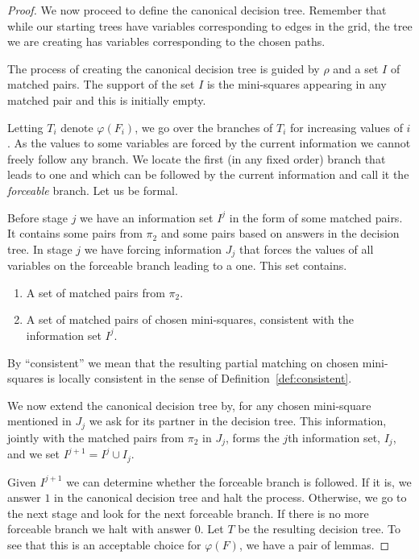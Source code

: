 \documentclass{article}\usepackage[a4paper,margin=20mm]{geometry}
\begin{document}
\begin{proof}
We now proceed to define the
canonical decision tree.  Remember that while our starting trees
have variables corresponding to edges in the grid, the tree we 
are creating has variables corresponding to the chosen paths.

The process of creating the canonical decision tree
is guided by $\rho$
and a set $I$ of matched pairs.  The support of the set
$I$ is the mini-squares appearing in any matched
pair and this is initially empty.

Letting $T_i$ denote $\varphi(F_i)$,
we go over the branches of $T_i$ for increasing
values of $i$.  As the values to some variables
are forced by the current information we cannot freely
follow any branch.  We locate the first (in any fixed order)
branch that leads to one and which can be followed
by the current information and call it the {\em forceable} branch.
Let us be formal.

Before stage $j$ we have an information set $I^{j}$ in the form of
some matched pairs.  It contains
some pairs from $\pi_2$ and some pairs based on answers in the decision
tree.  In stage $j$ we have forcing information $J_j$ that forces
the values of all variables on the forceable branch leading
to a one.  This set contains.

\begin{enumerate}

\item A set of matched pairs from $\pi_2$.

\item A set of matched pairs of chosen mini-squares, consistent
with the information set $I^j$.

\end{enumerate}
By ``consistent'' we mean that the resulting partial
matching on chosen mini-squares is locally consistent in the 
sense of Definition~\ref{def:consistent}.

We now extend the canonical decision tree
by, for any chosen mini-square mentioned in $J_j$ we ask
for its partner in the decision tree.  This
information, jointly with the matched pairs from $\pi_2$
in $J_j$, forms the $j$th information set, $I_{j}$, and
we set $I^{j+1}= I^j \cup I_j$.

Given $I^{j+1}$ we can determine whether the forceable
branch is followed.  If it is, we answer $1$ in the canonical
decision tree and halt the process.  Otherwise, we go to the next stage
and look for the next forceable branch.  If there is no more forceable
branch we halt with answer $0$.  Let $T$ be the resulting decision
tree.  To see that this is an acceptable choice for $\varphi (F)$,
we have a pair of lemmas.


\end{proof}
\end{document}
